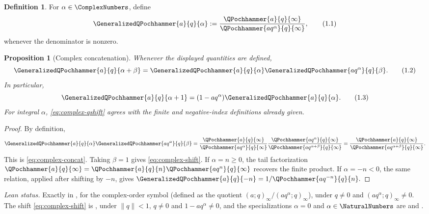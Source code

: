 \documentclass[11pt,a4paper,oneside,openany]{book}
\newtheorem{proposition}[proposition]{Proposition}
\theoremstyle{definition}
\newtheorem{definition}[definition]{Definition}
\theoremstyle{remark}
\begin{document}
\begin{definition}\label{def:complex-qshift}
For $\alpha\in\ComplexNumbers$, define
\[
 \GeneralizedQPochhammer{a}{q}{\alpha}
 :=\frac{\QPochhammer{a}{q}{\infty}}{\QPochhammer{aq^\alpha}{q}{\infty}},
 \tag{1.1}\label{eq:complex-qshift}
\]
whenever the denominator is nonzero.
\end{definition}

\begin{proposition}[Complex concatenation]\label{prop:complex-concat}
Whenever the displayed quantities are defined,
\[
 \GeneralizedQPochhammer{a}{q}{\alpha+\beta}
 =\GeneralizedQPochhammer{a}{q}{\alpha}
  \GeneralizedQPochhammer{aq^\alpha}{q}{\beta}.
 \tag{1.2}\label{eq:complex-concat}
\]
In particular,
\[
 \GeneralizedQPochhammer{a}{q}{\alpha+1}
 =(1-aq^\alpha)\GeneralizedQPochhammer{a}{q}{\alpha}.
 \tag{1.3}\label{eq:complex-shift}
\]
For integral $\alpha$, \eqref{eq:complex-qshift} agrees with the finite and negative-index definitions already given.
\end{proposition}

\begin{proof}
By definition,
\[
 \GeneralizedQPochhammer{a}{q}{\alpha}
 \GeneralizedQPochhammer{aq^\alpha}{q}{\beta}
 =\frac{\QPochhammer{a}{q}{\infty}}{\QPochhammer{aq^\alpha}{q}{\infty}}
  \frac{\QPochhammer{aq^\alpha}{q}{\infty}}{\QPochhammer{aq^{\alpha+\beta}}{q}{\infty}}
 =\frac{\QPochhammer{a}{q}{\infty}}{\QPochhammer{aq^{\alpha+\beta}}{q}{\infty}}.
\]
This is \eqref{eq:complex-concat}.  Taking $\beta=1$ gives \eqref{eq:complex-shift}.  If $\alpha=n\ge0$, the tail factorization
\(
 \QPochhammer{a}{q}{\infty}
 =\QPochhammer{a}{q}{n}\QPochhammer{aq^n}{q}{\infty}
\)
recovers the finite product.  If $\alpha=-n<0$, the same relation, applied after shifting by $-n$, gives
\(
 \GeneralizedQPochhammer{a}{q}{-n}=1/\QPochhammer{aq^{-n}}{q}{n}.
\)
\end{proof}

\emph{Lean status.}  Exactly  in
, for the complex-order symbol
 (defined as the quotient $(a;q)_\infty/(aq^\alpha;q)_\infty$),
under $q\ne0$ and $(aq^\alpha;q)_\infty\ne0$.  The shift \eqref{eq:complex-shift} is
, under $\lVert q\rVert<1$, $q\ne0$ and $1-aq^\alpha\ne0$,
and the specializations $\alpha=0$ and $\alpha\in\NaturalNumbers$ are
 and .
\end{document}
